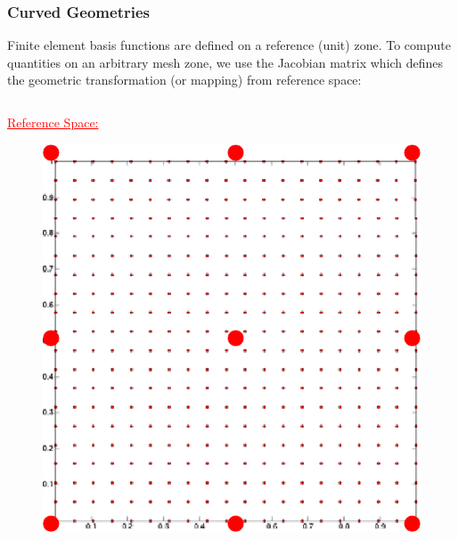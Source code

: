 \documentclass[8pt,xcolor=svgnames]{beamer}
\begin{document}
\begin{frame}[shrink=5]
 \frametitle{Curved Geometries}
 
 Finite element basis functions are defined on a reference (unit) zone. To compute quantities on an arbitrary mesh zone, we use the Jacobian matrix  which defines the geometric transformation (or mapping) from reference space: 

 \smallskip 
 \begin{columns}
  \begin{column}{0.3\textwidth}
  \centering
  \textcolor{red}{\underline{Reference Space:}}
   \begin{figure}[h!]
    \centering
    \includegraphics[width=1.0\textwidth,keepaspectratio=true]{./Images/refSpace.png}
    \end{figure}
    \centering
    


\end{column}
\end{columns}
\end{frame}
\end{document}
